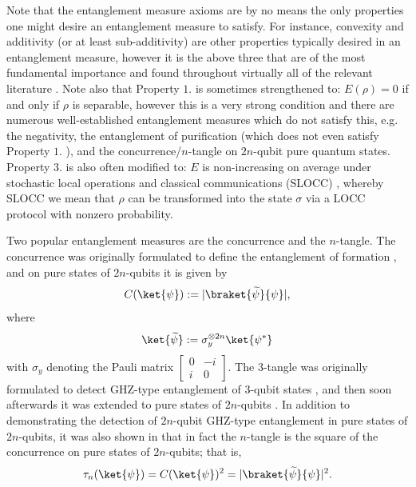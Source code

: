 \documentclass{article}
\begin{document}
Note that the entanglement measure axioms are by no means the only properties one might desire an entanglement measure to satisfy. For instance, convexity and additivity (or at least sub-additivity) are other properties typically desired in an entanglement measure, however it is the above three that are of the most fundamental importance and found throughout virtually all of the relevant literature \cite{eltschka2014quantifying,zhahir2022entanglement}. Note also that Property $1.$ is sometimes strengthened to: $E(\rho)=0$ if and only if $\rho$ is separable, however this is a very strong condition and there are numerous well-established entanglement measures which do not satisfy this, e.g. the negativity, the entanglement of purification (which does not even satisfy Property $1.$ \cite{bengtsson2017geometry}), and the concurrence/$n$-tangle on $2n$-qubit pure quantum states. Property $3.$ is also often modified to: $E$ is non-increasing on average under stochastic local operations and classical communications (SLOCC) \cite{eltschka2014quantifying,bengtsson2017geometry}, whereby SLOCC we mean that $\rho$ can be transformed into the state $\sigma$ via a LOCC protocol with nonzero probability. 

Two popular entanglement measures are the concurrence and the $n$-tangle. The concurrence was originally formulated to define the entanglement of formation \cite{hill1997entanglement,wootters1998entanglement}, and on pure states of $2n$-qubits it is given by 
\[C(\ket{\psi}) := |\braket{\widetilde{\psi}}{\psi}|,\]
where 
\[\ket{\widetilde{\psi}} := \sigma_y^{\otimes 2n}\ket{\psi^*}\]
with $\sigma_y$ denoting the Pauli matrix $\left[\begin{array}{cc}
    0 & -i \\
    i & 0
\end{array}\right]$. The $3$-tangle was originally formulated to detect GHZ-type entanglement of $3$-qubit states \cite{dur2000three}, and then soon afterwards it was extended to pure states of $2n$-qubits \cite{wong2001potential}. In addition to demonstrating the detection of $2n$-qubit GHZ-type entanglement in pure states of $2n$-qubits, it was also shown in \cite{wong2001potential} that in fact the $n$-tangle is the square of the concurrence on pure states of $2n$-qubits; that is, 
\[\tau_n(\ket{\psi}) = C(\ket{\psi})^2 = |\braket{\widetilde{\psi}}{\psi}|^2.\] 
\end{document}
